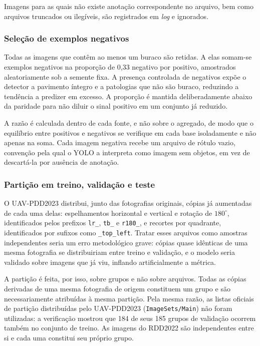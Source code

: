 \documentclass[12pt]{article}
\begin{document}
Imagens para as quais não existe anotação correspondente no arquivo, bem
como arquivos truncados ou ilegíveis, são registrados em \emph{log} e
ignorados.

\subsubsection{Seleção de exemplos negativos}
\label{sec:negativos}

Todas as imagens que contêm ao menos um buraco são retidas. A elas
somam-se exemplos negativos na proporção de 0,33 negativo por positivo,
amostrados aleatoriamente sob a semente fixa. A presença controlada de
negativos expõe o detector a pavimento íntegro e a patologias que não são
buraco, reduzindo a tendência a predizer em excesso. A proporção é
mantida deliberadamente abaixo da paridade para não diluir o sinal
positivo em um conjunto já reduzido.

A razão é calculada dentro de cada fonte, e não sobre o agregado, de modo
que o equilíbrio entre positivos e negativos se verifique em cada base
isoladamente e não apenas na soma. Cada imagem negativa recebe um arquivo
de rótulo vazio, convenção pela qual o YOLO a interpreta como imagem sem
objetos, em vez de descartá-la por ausência de anotação.

\subsubsection{Partição em treino, validação e teste}
\label{sec:particao}

O UAV-PDD2023 distribui, junto das fotografias originais, cópias já
aumentadas de cada uma delas: espelhamentos horizontal e vertical e
rotação de $180^\circ$, identificados pelos prefixos \texttt{lr\_},
\texttt{tb\_} e \texttt{r180\_}, e recortes por quadrante, identificados
por sufixos como \texttt{\_top\_left}. Tratar esses arquivos como
amostras independentes seria um erro metodológico grave: cópias quase
idênticas de uma mesma fotografia se distribuiriam entre treino e
validação, e o modelo seria validado sobre imagens que já viu, inflando
artificialmente a métrica.

A partição é feita, por isso, sobre grupos e não sobre arquivos. Todas as
cópias derivadas de uma mesma fotografia de origem constituem um grupo e
são necessariamente atribuídas à mesma partição. Pela mesma razão, as
listas oficiais de partição distribuídas pelo UAV-PDD2023
(\texttt{ImageSets/Main}) não foram utilizadas: a verificação mostrou que
184 de seus 185 grupos de validação ocorrem também no conjunto de treino.
As imagens do RDD2022 são independentes entre si e cada uma constitui seu
próprio grupo.
\end{document}
